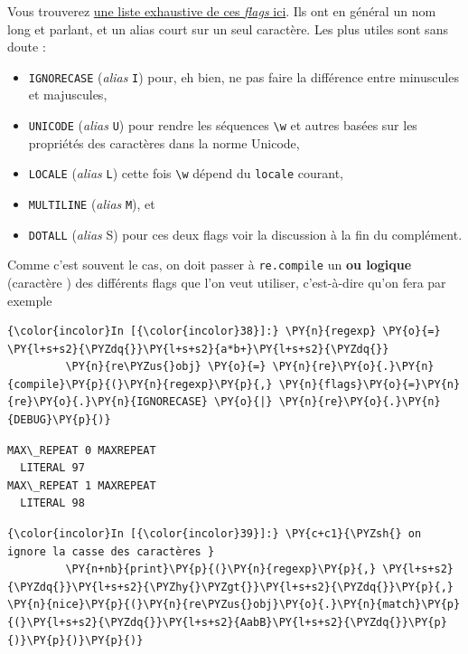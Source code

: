     Vous trouverez
\href{https://docs.python.org/3/library/re.html\#module-contents}{une
liste exhaustive de ces \emph{flags} ici}. Ils ont en général un nom
long et parlant, et un alias court sur un seul caractère. Les plus
utiles sont sans doute :

\begin{itemize}
	\item 
	\texttt{IGNORECASE} (\emph{alias} \texttt{I})
	pour, eh bien, ne pas faire la différence entre minuscules et
	majuscules,
	\item
	\texttt{UNICODE} (\emph{alias} \texttt{U}) pour rendre les
	séquences \texttt{\textbackslash{}w} et autres basées sur les propriétés
	des caractères dans la norme Unicode,
	\item
	\texttt{LOCALE} (\emph{alias}
	\texttt{L}) cette fois \texttt{\textbackslash{}w} dépend du
	\texttt{locale} courant,
	\item
	\texttt{MULTILINE} (\emph{alias} \texttt{M}),
	et
	\item
	\texttt{DOTALL} (\emph{alias} S) pour ces deux flags voir la
	discussion à la fin du complément.
\end{itemize}

    Comme c'est souvent le cas, on doit passer à \texttt{re.compile} un
\textbf{ou logique} (caractère \texttt{\textbar{}}) des différents flags
que l'on veut utiliser, c'est-à-dire qu'on fera par exemple

    \begin{Verbatim}[commandchars=\\\{\}]
{\color{incolor}In [{\color{incolor}38}]:} \PY{n}{regexp} \PY{o}{=} \PY{l+s+s2}{\PYZdq{}}\PY{l+s+s2}{a*b+}\PY{l+s+s2}{\PYZdq{}}
         \PY{n}{re\PYZus{}obj} \PY{o}{=} \PY{n}{re}\PY{o}{.}\PY{n}{compile}\PY{p}{(}\PY{n}{regexp}\PY{p}{,} \PY{n}{flags}\PY{o}{=}\PY{n}{re}\PY{o}{.}\PY{n}{IGNORECASE} \PY{o}{|} \PY{n}{re}\PY{o}{.}\PY{n}{DEBUG}\PY{p}{)}
\end{Verbatim}


    \begin{Verbatim}[commandchars=\\\{\}]
MAX\_REPEAT 0 MAXREPEAT
  LITERAL 97
MAX\_REPEAT 1 MAXREPEAT
  LITERAL 98

    \end{Verbatim}

    \begin{Verbatim}[commandchars=\\\{\}]
{\color{incolor}In [{\color{incolor}39}]:} \PY{c+c1}{\PYZsh{} on ignore la casse des caractères }
         \PY{n+nb}{print}\PY{p}{(}\PY{n}{regexp}\PY{p}{,} \PY{l+s+s2}{\PYZdq{}}\PY{l+s+s2}{\PYZhy{}\PYZgt{}}\PY{l+s+s2}{\PYZdq{}}\PY{p}{,} \PY{n}{nice}\PY{p}{(}\PY{n}{re\PYZus{}obj}\PY{o}{.}\PY{n}{match}\PY{p}{(}\PY{l+s+s2}{\PYZdq{}}\PY{l+s+s2}{AabB}\PY{l+s+s2}{\PYZdq{}}\PY{p}{)}\PY{p}{)}\PY{p}{)}
\end{Verbatim}



